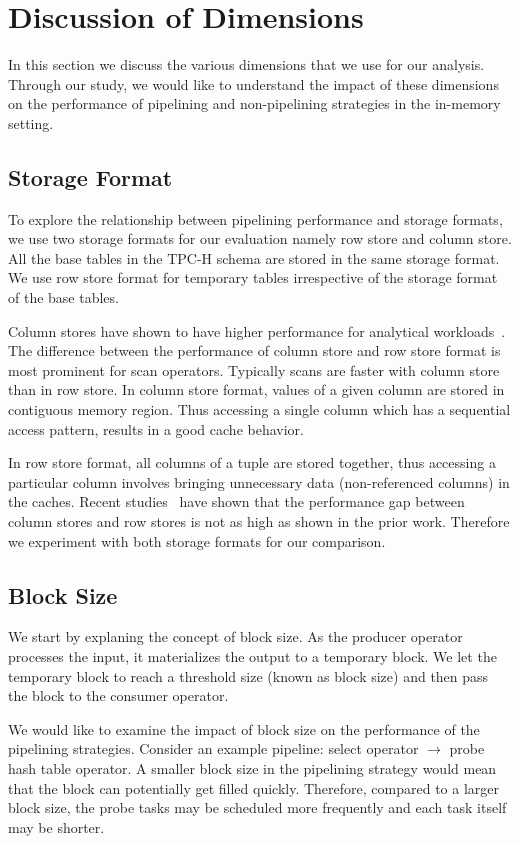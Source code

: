 \section{Discussion of Dimensions}\label{sec:dimensions}
In this section we discuss the various dimensions that we use for our analysis.
Through our study, we would like to understand the impact of these dimensions on the performance of pipelining and non-pipelining strategies in the in-memory setting. 

\subsection{Storage Format}
To explore the relationship between pipelining performance and storage formats, we use two storage formats for our evaluation namely row store and column store.
All the base tables in the TPC-H schema are stored in the same storage format.
We use row store format for temporary tables irrespective of the storage format of the base tables.

Column stores have shown to have higher performance for analytical workloads~\cite{DBLP:conf/sigmod/AbadiMH08}. 
The difference between the performance of column store and row store format is most prominent for scan operators.
Typically scans are faster with column store than in row store.
In column store format, values of a given column are stored in contiguous memory region.
Thus accessing a single column which has a sequential access pattern, results in a good cache behavior.

In row store format, all columns of a tuple are stored together, thus accessing a particular column involves bringing unnecessary data (non-referenced columns) in the caches. 
Recent studies~\cite{quickstep-system} have shown that the performance gap between column stores and row stores is not as high as shown in the prior work.
Therefore we experiment with both storage formats for our comparison. 

\subsection{Block Size}
We start by explaning the concept of block size.
As the producer operator processes the input, it materializes the output to a temporary block. 
We let the temporary block to reach a threshold size (known as block size) and then pass the block to the consumer operator. 

We would like to examine the impact of block size on the performance of the pipelining strategies. 
Consider an example pipeline: select operator $\rightarrow$ probe hash table operator.
A smaller block size in the pipelining strategy would mean that the block can potentially get filled quickly. 
Therefore, compared to a larger block size, the probe tasks may be scheduled more frequently and each task itself may be shorter. 

